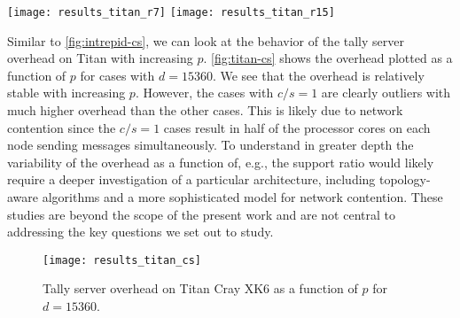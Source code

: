 \documentclass[3p]{elsarticle}
\begin{document}
\begin{figure*}[!tbh]
  \begin{floatrow}
     {\texttt{[image: results\_titan\_r7]}}
     {\texttt{[image: results\_titan\_r15]}}
  \end{floatrow}
\end{figure*}

Similar to \autoref{fig:intrepid-cs}, we can look at the behavior of the tally
server overhead on Titan with increasing $p$. \autoref{fig:titan-cs} shows the
overhead plotted as a function of $p$ for cases with $d = 15360$. We see that
the overhead is relatively stable with increasing $p$. However, the cases with
$c/s = 1$ are clearly outliers with much higher overhead than the other
cases. This is likely due to network contention since the $c/s = 1$ cases result
in half of the processor cores on each node sending messages simultaneously. To
understand in greater depth the variability of the overhead as a function of,
e.g., the support ratio would likely require a deeper investigation of a
particular architecture, including topology-aware algorithms and a more
sophisticated model for network contention. These studies are beyond the scope
of the present work and are not central to addressing the key questions we set
out to study.

\begin{figure}[!tbh]
  \centering
  \texttt{[image: results\_titan\_cs]}
  \caption{Tally server overhead on Titan Cray XK6 as a function of $p$ for $d =
    15360$.}
  \label{fig:titan-cs}
\end{figure}
\end{document}
